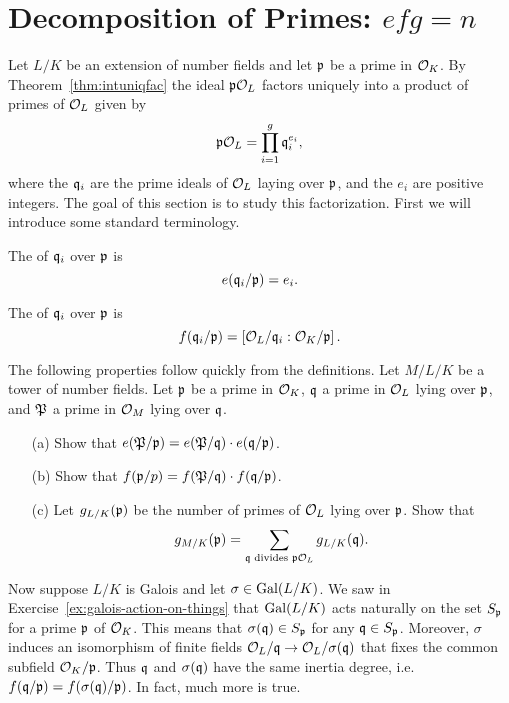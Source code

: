 \section{Decomposition of Primes: $efg=n$}

Let $L/K$ be an extension of number fields and let $\p$ be a prime
in $\O_K$. By Theorem~\ref{thm:intuniqfac} the ideal $\p\O_L$ factors
uniquely into a product of primes of $\O_L$ given by
$$
	\p\O_L = \prod_{i=1}^g \q^{e_i}_i,
$$
where the $\q_i$ are the prime ideals of $\O_L$ laying over $\p$, and
the $e_i$ are positive integers. The goal of this section is to study this
factorization. First we will introduce some standard terminology.

\begin{definition}
	The  of $\q_i$ over $\p$ is
	$$
		e(\q_i/\p) = e_i.
	$$
\end{definition}

\begin{definition}
	The 
	of $\q_i$ over $\p$ is
	$$
		f(\q_i/\p) = \left[\O_L/\q_i : \O_K/\p\right].
	$$
\end{definition}

\begin{exercise}\label{ex:ramificationmultiplicative}
	The following properties follow quickly from the definitions.
	Let $M/L/K$ be a tower of number fields. Let $\p$ be a prime
	in $\O_K$, $\q$ a prime in $\O_L$ lying over $\p$, and $\P$ a prime
	in $\O_M$ lying over $\q$.
	\begin{enumerate}
		\item[(a)] Show that $e(\P/\p)=e(\P/\q) \cdot e(\q/\p)$.
		
		\item[(b)] Show that $f(\p/p)=f(\P/\q) \cdot f(\q/\p)$.
		
		\item[(c)] Let $g_{L/K}(\p)$ be the number of primes
		of $\O_L$ lying over $\p$. Show that
		$$
			g_{M/K}(\p) = \sum\limits_{\q \text{ divides } \p\O_L} g_{L/K}(\q).
		$$
	\end{enumerate}
\end{exercise}


Now suppose $L/K$ is Galois and let $\sigma\in\Gal(L/K)$.
We saw in Exercise~\ref{ex:galois-action-on-things} that $\Gal(L/K)$ acts
naturally on the set $S_\p$ for a prime $\p$ of $\O_K$.
This means that $\sigma(\q) \in S_\p$ for any $\q \in S_\p$. Moreover,
$\sigma$ induces an isomorphism of finite fields $\O_L/\q\to \O_L/\sigma(\q)$
that fixes the common subfield $\O_K/\p$. Thus $\q$ and $\sigma(\q)$ have
the same inertia degree, i.e. $f(\q/\p) = f(\sigma(\q)/\p)$.
In fact, much more is true.




